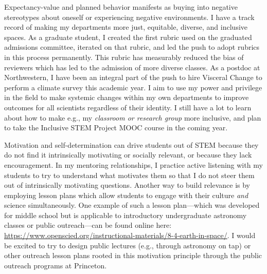 \documentclass[12pt]{article}
\begin{document}
Expectancy-value and planned behavior manifests as buying into negative stereotypes about oneself or experiencing negative environments.
I have a track record of making my departments more just, equitable, diverse, and inclusive spaces.
As a graduate student, I created the first rubric used on the graduated admissions committee, iterated on that rubric, and led the push to adopt rubrics in this process permanently.
This rubric has measurably reduced the bias of reviewers which has led to the admission of more diverse classes.
As a postdoc at Northwestern, I have been an integral part of the push to hire Visceral Change to perform a climate survey this academic year.
I aim to use my power and privilege in the field to make systemic changes within my own departments to improve outcomes for all scientists regardless of their identity.
I still have a lot to learn about how to make e.g., my \emph{classroom or research group} more inclusive, and plan to take the Inclusive STEM Project MOOC course in the coming year.

Motivation and self-determination can drive students out of STEM because they do not find it intrinsically motivating or socially relevant, or because they lack encouragement.
In my mentoring relationships, I practice active listening \citep{jahromi_etal_2016} with my students to try to understand what motivates them so that I do not steer them out of intrinsically motivating questions.
Another way to build relevance is by employing lesson plans which allow students to engage with their culture \emph{and} science simultaneously.
One example of such a lesson plan---which was developed for middle school but is applicable to introductory undergraduate astronomy classes or public outreach---can be found online here: \url{https://www.openscied.org/instructional-materials/8-4-earth-in-space/}.
I would be excited to try to design public lectures (e.g., through astronomy on tap) or other outreach lesson plans rooted in this motivation principle through the public outreach programs at Princeton.

\end{document}
